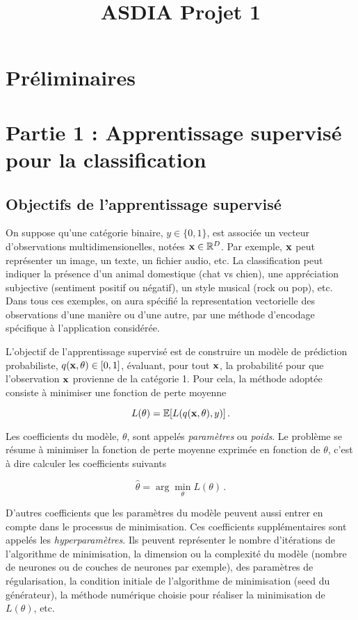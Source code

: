 \documentclass[]{article}
\title{ASDIA Projet 1}
\author{}
\date{}
\begin{document}
\maketitle

\section{Préliminaires}\label{preliminaires}

\section{Partie 1 : Apprentissage supervisé pour la
classification}\label{partie-1-apprentissage-supervise-pour-la-classification}

\subsection{Objectifs de l'apprentissage
supervisé}\label{objectifs-de-lapprentissage-supervise}

On suppose qu'une catégorie binaire, \(y \in \{0,1\}\), est associée un
vecteur d'observations multidimensionelles, notées
\({\bf x} \in \mathbb{R}^D\). Par exemple, \({\bf x}\) peut représenter
un image, un texte, un fichier audio, etc. La classification peut
indiquer la présence d'un animal domestique (chat vs chien), une
appréciation subjective (sentiment positif ou négatif), un style musical
(rock ou pop), etc. Dans tous ces exemples, on aura spécifié la
representation vectorielle des observations d'une manière ou d'une
autre, par une méthode d'encodage spécifique à l'application considérée.

L'objectif de l'apprentissage supervisé est de construire un modèle de
prédiction probabiliste, \(q({\bf x}, \theta) \in [0,1]\), évaluant,
pour tout \({\bf x}\), la probabilité pour que l'observation \({\bf x}\)
provienne de la catégorie 1. Pour cela, la méthode adoptée consiste à
minimiser une fonction de perte moyenne

\[
  L(\theta) = \mathbb{E}[L(q({\bf x}, \theta), y)] \, .
\]

Les coefficients du modèle, \(\theta\), sont appelés \emph{paramètres}
ou \emph{poids}. Le problème se résume à minimiser la fonction de perte
moyenne exprimée en fonction de \(\theta\), c'est à dire calculer les
coefficients suivants

\[
\hat \theta = \arg\min_{\theta} L(\theta) \, .
\]

D'autres coefficients que les paramètres du modèle peuvent aussi entrer
en compte dans le processus de minimisation. Ces coefficients
supplémentaires sont appelés les \emph{hyperparamètres}. Ils peuvent
représenter le nombre d'itérations de l'algorithme de minimisation, la
dimension ou la complexité du modèle (nombre de neurones ou de couches
de neurones par exemple), des paramètres de régularisation, la condition
initiale de l'algorithme de minimisation (seed du générateur), la
méthode numérique choisie pour réaliser la minimisation de
\(L(\theta)\), etc.
\end{document}
